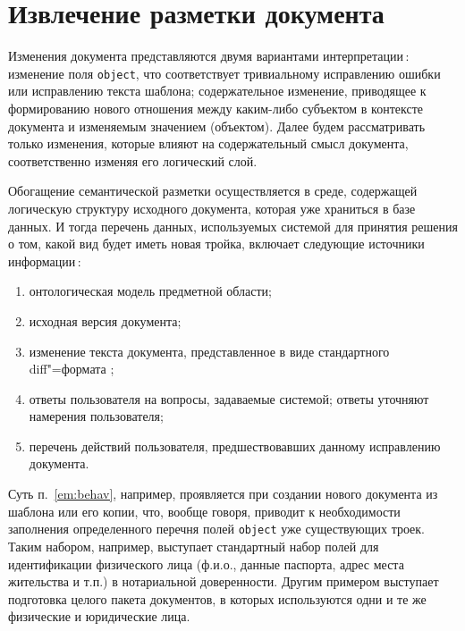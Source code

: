 \documentclass[utf8]{../IncArticle}
\begin{document}
\section{Извлечение разметки документа} \label{sec:markupproc}

Изменения документа представляются двумя вариантами интерпретации\,:
изменение поля \texttt{object}, что соответствует тривиальному
исправлению ошибки или исправлению текста шаблона; содержательное
изменение, приводящее к формированию нового отношения между каким-либо
субъектом в контексте документа и изменяемым значением (объектом).
Далее будем рассматривать только изменения, которые влияют на
содержательный смысл документа, соответственно изменяя его логический
слой.

Обогащение семантической разметки осуществляется в среде, содержащей
логическую структуру исходного документа, которая уже храниться в базе
данных.  И тогда перечень данных, используемых системой для принятия
решения о том, какой вид будет иметь новая тройка, включает следующие
источники информации\,:
\begin{enumerate}
\item онтологическая модель предметной области;
\item исходная версия документа;
\item изменение текста документа, представленное в виде стандартного
  diff"=формата \cite{diff};
\item ответы пользователя на вопросы, задаваемые системой; ответы
  уточняют намерения пользователя;
\item перечень действий пользователя, предшествовавших данному
  исправлению документа. \label{em:behav}
\end{enumerate}
Суть п.~\ref{em:behav}, например, проявляется при создании нового
документа из шаблона или его копии, что, вообще говоря, приводит к
необходимости заполнения определенного перечня полей \texttt{object}
уже существующих троек.  Таким набором, например, выступает
стандартный набор полей для идентификации физического лица (ф.и.о.,
данные паспорта, адрес места жительства и т.п.) в нотариальной
доверенности.  Другим примером выступает подготовка целого пакета
документов, в которых используются одни и те же физические и
юридические лица.
\end{document}
